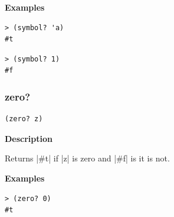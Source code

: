 \documentclass[a4paper]{article}
\begin{document}
\textbf{Examples}

\begin{lstlisting}
> (symbol? 'a)
#t
\end{lstlisting}

\begin{lstlisting}
> (symbol? 1)
#f
\end{lstlisting}

\subsubsection{zero?}

\begin{lstlisting}[frame=none]
(zero? z)
\end{lstlisting}

\textbf{Description}

Returns |#t| if |z| is zero and |#f| is it is not.

\textbf{Examples}

\begin{lstlisting}
> (zero? 0)
#t
\end{lstlisting}
\end{document}
